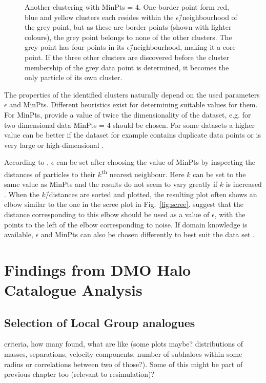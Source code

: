 \documentclass[english, oneside]{HYgradu}
\begin{document}
\begin{figure}
    \centering
    
    \caption{Another clustering with MinPts = 4. One border point form red, blue and yellow clusters each resides within the $\epsilon$\=/neighbourhood of the grey point, but as these are border points (shown with lighter colours), the grey point belongs to none of the other clusters. The grey point has four points in its $\epsilon$\=/neighbourhood, making it a core point. If the three other clusters are discovered before the cluster membership of the grey data point is determined, it becomes the only particle of its own cluster.}\label{fig:DBSCAN-singlecore}
\end{figure}

The properties of the identified clusters naturally depend on the used parameters $\epsilon$ and MinPts. Different heuristics exist for determining suitable values for them. For MinPts, \citet{schubert2017dbscan} provide a value of twice the dimensionality of the dataset, e.g. for two dimensional data MinPts = 4 should be chosen. For some datasets a higher value can be better if the dataset for example contains duplicate data points or is very large or high-dimensional \citep{schubert2017dbscan}.

According to \citet{ester1996density}, $\epsilon$ can be set after choosing the value of MinPts by inspecting the distances of particles to their $k$\textsuperscript{th} nearest neighbour. Here $k$ can be set to the same value as MinPts and the results do not seem to vary greatly if $k$ is increased \citep{ester1996density}. When the $k$\=/distances are sorted and plotted, the resulting plot often shows an elbow similar to the one in the scree plot in Fig.\ \ref{fig:scree}. \citet{ester1996density} suggest that the distance corresponding to this elbow should be used as a value of $\epsilon$, with the points to the left of the elbow corresponding to noise. If domain knowledge is available, $\epsilon$ and MinPts can also be chosen differently to best suit the data set \citep{schubert2017dbscan}.


\chapter{Findings from DMO Halo Catalogue Analysis}
\section{Selection of Local Group analogues}
criteria, how many found, what are like (some plots maybe? distributions of masses, separations, velocity components, number of subhaloes within some radius or correlations between two of those?). Some of this might be part of previous chapter too (relevant to resimulation)?
\end{document}
